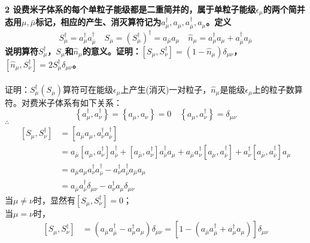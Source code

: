 \documentclass[12pt]{article}
\numberwithin{equation}{section}	 %
\begin{document}
\begin{spacing}{1.5}
\textbf{2 \quad 设费米子体系的每个单粒子能级都是二重简并的，属于单粒子能级$\epsilon_{\mu}$的两个简并态用$\mu,\bar\mu$标记，相应的产生、消灭算符记为$a_{\mu}^{\dag},a_{\mu},a_{\bar\mu}^{\dag},a_{\mu}$。定义
\begin{equation}\nonumber 		%
S_{\mu}^{\dag}=a_{\mu}^{\dag}a_{\bar\mu}^{\dag} \quad S_{\mu}=\left(S_{\mu}^{\dag}\right)^{\dag}=a_{\bar\mu}a_{\mu} \quad \hat{n}_{\mu}=a_{\mu}^{\dag}a_{\mu}+a_{\bar\mu}^{\dag}a_{\bar\mu}
\end{equation}
说明算符$S_{\mu}^{\dag}$，$S_{\mu}$和$\hat{n}_{\mu}$的意义。证明：$\displaystyle \left[S_{\mu},S_{\nu}^{\dag}\right]=\left(1-\hat{n}_{\mu}\right)\delta_{\mu\nu}$，$\displaystyle \left[\hat{n}_{\mu},S_{\nu}^{\dag}\right]=2S_{\mu}^{\dag}\delta_{\mu\nu}$。}\\
~\\
证明：$S_{\mu}^{\dag}(S_{\mu})$算符可在能级$\epsilon_{\mu}$上产生(消灭)一对粒子，$\hat{n}_{\mu}$是能级$\epsilon_{\mu}$上的粒子数算符。对费米子体系有如下关系：\\
\begin{equation}
\left\{a_{\mu}^{\dag},a_{\nu}^{\dag}\right\} = \left\{a_{\mu},a_{\nu}\right\} = 0 \quad \left\{a_{\mu},a_{\nu}^{\dag}\right\} = \delta_{\mu\nu}
\end{equation}
$\therefore$
\begin{align*}
\left[S_{\mu},S_{\nu}^{\dag}\right] &= \left[a_{\bar\mu}a_{\mu} , a_{\nu}^{\dag}a_{\bar\nu}^{\dag}\right] \\
&= a_{\bar\mu}\left[a_{\mu} , a_{\nu}^{\dag}\right]a_{\bar\nu}^{\dag} + \left[a_{\bar\mu} , a_{\nu}^{\dag}\right]a_{\bar\nu}^{\dag}a_{\mu} + a_{\bar\mu}a_{\nu}^{\dag}\left[a_{\mu} , a_{\bar\nu}^{\dag}\right] + a_{\nu}^{\dag}\left[a_{\bar\mu} , a_{\bar\nu}^{\dag}\right]a_{\mu}\\
&= a_{\bar\mu}a_{\mu}a_{\nu}^{\dag}a_{\bar\nu}^{\dag} - a_{\nu}^{\dag}a_{\bar\nu}^{\dag}a_{\bar\mu}a_{\mu} \\
&= a_{\bar\mu}a_{\bar\nu}^{\dag}\delta_{\mu\nu} - a_{\nu}^{\dag}a_{\mu}\delta_{\mu\nu}
\end{align*}
当$\mu \ne \nu$时，显然有$\displaystyle \left[S_{\mu},S_{\nu}^{\dag}\right] = 0$；\\
当$\mu = \nu$时，
\begin{align*}
\left[S_{\mu},S_{\nu}^{\dag}\right] &= \left(a_{\bar\mu}a_{\bar\mu}^{\dag} - a_{\mu}^{\dag}a_{\mu}\right)\delta_{\mu\nu} = \left[1-\left(a_{\bar\mu}a_{\bar\mu}^{\dag} + a_{\mu}^{\dag}a_{\mu}\right)\right]\delta_{\mu\nu} \\

\end{align*}
\end{spacing}
\end{document}
